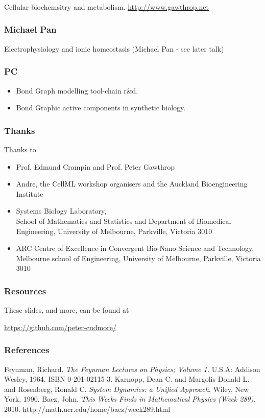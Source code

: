 \documentclass[11pt,reqno]{beamer}
\begin{document}
\begin{frame}
\frametitle{}
Cellular biochemsitry and metabolism.
\url{http://www.gawthrop.net}
\end{frame}
\begin{frame}
\frametitle{Michael Pan}
Electrophysiology and ionic homeostasis (Michael Pan - see later talk)
\end{frame}
\begin{frame}
\frametitle{PC}
\begin{itemize}
	\item Bond Graph modelling tool-chain r\&d.
	\item Bond Graphic active components in synthetic biology.
\end{itemize}



\end{frame}



\begin{frame}
\frametitle{Thanks}
{\small
Thanks to
\begin{itemize}
	\item Prof. Edmund Crampin and Prof. Peter Gawthrop
	\item Andre, the CellML workshop organisers and the Auckland Bioengineering Institute

\item Systems Biology Laboratory, \\ School of Mathematics and Statistics and Department of Biomedical Engineering, University of Melbourne, Parkville, Victoria 3010

\item ARC Centre of Excellence in Convergent Bio-Nano Science and Technology, \\
Melbourne school of Engineering, 
University of Melbourne, Parkville, Victoria 3010
\end{itemize}
}

\end{frame}

\begin{frame}
\frametitle{Resources}
\begin{center}
These slides, and more, can be found at

\url{https://github.com/peter-cudmore/}

\end{center}


\end{frame}
\begin{frame}
\frametitle{References}
{\tiny
	\begin{thebibliography}{3}
		 Feynman, Richard. \emph{The Feynman Lectures on Physics; Volume 1.} U.S.A: Addison Wesley, 1964. ISBN 0-201-02115-3.
		 Karnopp, Dean C. and Margolis Donald L. and Rosenberg, Ronald C. \emph{System Dynamics: a Unified Approach}, Wiley, New York, 1990.
		 Baez, John. \emph{This Weeks Finds in Mathematical Physics (Week 289).} 2010.  http://math.ucr.edu/home/baez/week289.html 
\end{thebibliography}}
\end{frame}
\end{document}

